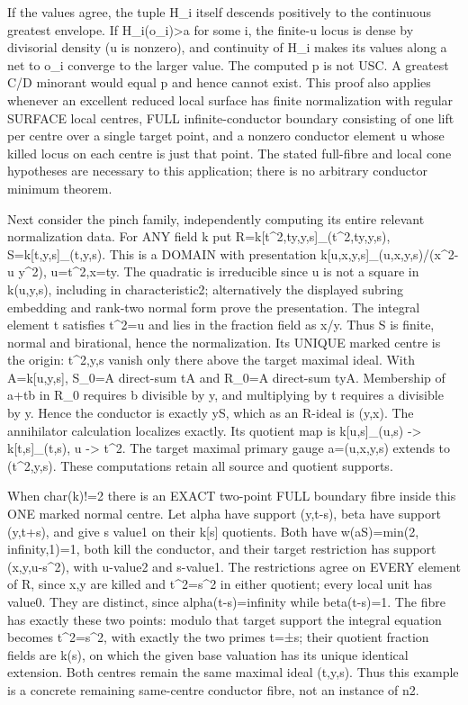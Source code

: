 If the values agree, the tuple H\_i itself descends positively to the continuous greatest envelope. If H\_i(o\_i)\textgreater{}a for some i, the finite-u locus is dense by divisorial density (u is nonzero), and continuity of H\_i makes its values along a net to o\_i converge to the larger value. The computed p is not USC. A greatest C/D minorant would equal p and hence cannot exist. This proof also applies whenever an excellent reduced local surface has finite normalization with regular SURFACE local centres, FULL infinite-conductor boundary consisting of one lift per centre over a single target point, and a nonzero conductor element u whose killed locus on each centre is just that point. The stated full-fibre and local cone hypotheses are necessary to this application; there is no arbitrary conductor minimum theorem.

Next consider the pinch family, independently computing its entire relevant normalization data. For ANY field k put
R=k[t\textasciicircum{}2,ty,y,s]\_(t\textasciicircum{}2,ty,y,s), S=k[t,y,s]\_(t,y,s).
This is a DOMAIN with presentation k[u,x,y,s]\_(u,x,y,s)/(x\textasciicircum{}2-u y\textasciicircum{}2), u=t\textasciicircum{}2,x=ty. The quadratic is irreducible since u is not a square in k(u,y,s), including in characteristic2; alternatively the displayed subring embedding and rank-two normal form prove the presentation. The integral element t satisfies t\textasciicircum{}2=u and lies in the fraction field as x/y. Thus S is finite, normal and birational, hence the normalization. Its UNIQUE marked centre is the origin: t\textasciicircum{}2,y,s vanish only there above the target maximal ideal. With A=k[u,y,s], S\_0=A direct-sum tA and R\_0=A direct-sum tyA. Membership of a+tb in R\_0 requires b divisible by y, and multiplying by t requires a divisible by y. Hence the conductor is exactly yS, which as an R-ideal is (y,x). The annihilator calculation localizes exactly. Its quotient map is
k[u,s]\_(u,s) -\textgreater{} k[t,s]\_(t,s), u -\textgreater{} t\textasciicircum{}2.
The target maximal primary gauge a=(u,x,y,s) extends to (t\textasciicircum{}2,y,s). These computations retain all source and quotient supports.

When char(k)!=2 there is an EXACT two-point FULL boundary fibre inside this ONE marked normal centre. Let alpha have support (y,t-s), beta have support (y,t+s), and give s value1 on their k[s] quotients. Both have w(aS)=min(2, infinity,1)=1, both kill the conductor, and their target restriction has support (x,y,u-s\textasciicircum{}2), with u-value2 and s-value1. The restrictions agree on EVERY element of R, since x,y are killed and t\textasciicircum{}2=s\textasciicircum{}2 in either quotient; every local unit has value0. They are distinct, since alpha(t-s)=infinity while beta(t-s)=1. The fibre has exactly these two points: modulo that target support the integral equation becomes t\textasciicircum{}2=s\textasciicircum{}2, with exactly the two primes t=±s; their quotient fraction fields are k(s), on which the given base valuation has its unique identical extension. Both centres remain the same maximal ideal (t,y,s). Thus this example is a concrete remaining same-centre conductor fibre, not an instance of n2.

